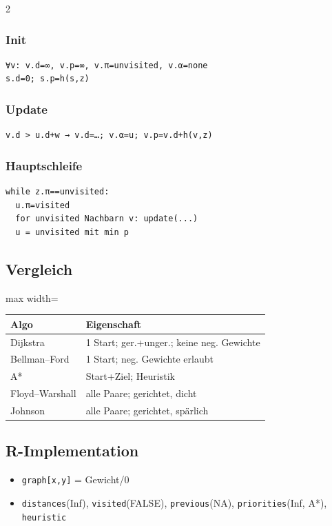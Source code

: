\documentclass[10pt, a4paper]{article}
\begin{document}
\begin{multicols}{2}
\subsubsection{Init}
\begin{lstlisting}
∀v: v.d=∞, v.p=∞, v.π=unvisited, v.α=none
s.d=0; s.p=h(s,z)
\end{lstlisting}



\subsubsection{Update}
\begin{lstlisting}
v.d > u.d+w → v.d=…; v.α=u; v.p=v.d+h(v,z)
\end{lstlisting}



\subsubsection{Hauptschleife}
\begin{lstlisting}
while z.π==unvisited:
  u.π=visited
  for unvisited Nachbarn v: update(...)
  u = unvisited mit min p
\end{lstlisting}



\subsection{Vergleich}

{\small
\begin{adjustbox}{max width=\linewidth}
{\scriptsize
\begin{tabular}{ll}
\toprule
\textbf{Algo} & \textbf{Eigenschaft} \\
\midrule
Dijkstra & 1 Start; ger.+unger.; keine neg. Gewichte \\
Bellman–Ford & 1 Start; neg. Gewichte erlaubt \\
A* & Start+Ziel; Heuristik \\
Floyd–Warshall & alle Paare; gerichtet, dicht \\
Johnson & alle Paare; gerichtet, spärlich \\
\bottomrule
\end{tabular}
}
\end{adjustbox}
}



\subsection{R-Implementation}
\begin{itemize}
  \item \texttt{graph[x,y]} = Gewicht/0
  \item \texttt{distances}(Inf), \texttt{visited}(FALSE), \texttt{previous}(NA), \texttt{priorities}(Inf, A*), \texttt{heuristic}
\end{itemize}



\end{multicols}
\end{document}
